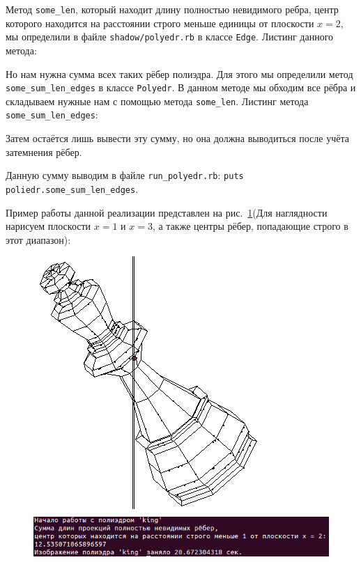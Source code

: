 Метод \verb|some_len|, который находит длину полностью невидимого ребра, центр которого находится на расстоянии строго меньше единицы от плоскости $x=2$, мы определили в файле \verb|shadow/polyedr.rb| в классе \verb|Edge|. Листинг данного метода:
\newpage
\begin{small}

\end{small}

Но нам нужна сумма всех таких рёбер полиэдра. Для этого мы определили метод \verb|some_sum_len_edges| в классе \verb|Polyedr|. В данном методе мы обходим все рёбра и складываем нужные нам с помощью метода \verb|some_len|. Листинг метода \verb|some_sum_len_edges|:
\begin{small}

\end{small}

Затем остаётся лишь вывести эту сумму, но она должна выводиться после учёта затемнения рёбер. 

Данную сумму выводим в файле \verb|run_polyedr.rb|: \verb|puts poliedr.some_sum_len_edges|.

Пример работы данной реализации представлен на рис.~\ref{fig:king}(Для наглядности нарисуем плоскости $x=1$ и $x=3$, а также центры рёбер, попадающие строго в этот диапазон):
\begin{figure}[ht!]
\begin{center}
\includegraphics[scale=0.3]{images/king}
\includegraphics[scale=0.5]{images/king_ex}
\end{center}
\vspace*{-8mm}
\caption{}\label{fig:king}
\end{figure}
